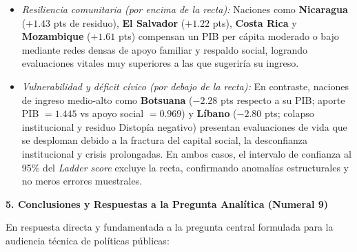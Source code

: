 \documentclass[9pt,a4paper]{article}
\newcommand{\customsection}[1]{%
  \vspace{0.2em}%
  {\small\bfseries\color{whrmagenta}#1}%
  \vspace{0.05em}\par%
}
\begin{document}
\begin{itemize}[leftmargin=1.1em]
    \begin{itemize}[nosep]
        \item \textit{Resiliencia comunitaria (por encima de la recta):} Naciones como \textbf{Nicaragua} ($+1.43$ pts de residuo), \textbf{El Salvador} ($+1.22$ pts), \textbf{Costa Rica} y \textbf{Mozambique} ($+1.61$ pts) compensan un PIB per cápita moderado o bajo mediante redes densas de apoyo familiar y respaldo social, logrando evaluaciones vitales muy superiores a las que sugeriría su ingreso.
        \item \textit{Vulnerabilidad y déficit cívico (por debajo de la recta):} En contraste, naciones de ingreso medio-alto como \textbf{Botsuana} ($-2.28$ pts respecto a su PIB; aporte PIB $= 1.445$ vs apoyo social $= 0.969$) y \textbf{Líbano} ($-2.80$ pts; colapso institucional y residuo Distopía negativo) presentan evaluaciones de vida que se desploman debido a la fractura del capital social, la desconfianza institucional y crisis prolongadas. En ambos casos, el intervalo de confianza al 95\% del \textit{Ladder score} excluye la recta, confirmando anomalías estructurales y no meros errores muestrales.
    \end{itemize}
\end{itemize}

\clearpage


\customsection{5. Conclusiones y Respuestas a la Pregunta Analítica (Numeral 9)}

En respuesta directa y fundamentada a la pregunta central formulada para la audiencia técnica de políticas públicas:
\end{document}
